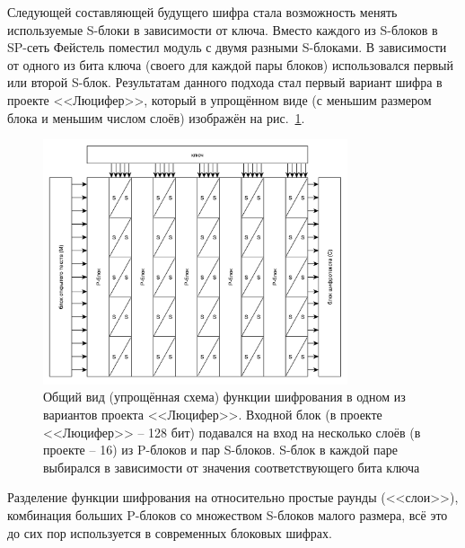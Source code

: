 Следующей составляющей будущего шифра стала возможность менять используемые S-блоки в зависимости от ключа. Вместо каждого из S-блоков в SP-сеть Фейстель поместил модуль с двумя разными S-блоками. В зависимости от одного из бита ключа (своего для каждой пары блоков) использовался первый или второй S-блок. Результатам данного подхода стал первый вариант шифра в проекте <<Люцифер>>, который в упрощённом виде (с меньшим размером блока и меньшим числом слоёв) изображён на рис.~\ref{fig:lucifer}.

\begin{figure}[htb]
	\centering
	\includegraphics[width=0.8\textwidth]{pic/lucifer}
  \caption{Общий вид (упрощённая схема) функции шифрования в одном из вариантов проекта <<Люцифер>>. Входной блок (в проекте <<Люцифер>> -- 128 бит) подавался на вход на несколько слоёв (в проекте -- 16) из P-блоков и пар S-блоков. S-блок в каждой паре выбирался в зависимости от значения соответствующего бита ключа}
  \label{fig:lucifer}
\end{figure}

Разделение функции шифрования на относительно простые раунды (<<слои>>), комбинация больших P-блоков со множеством S-блоков малого размера, всё это до сих пор используется в современных блоковых шифрах.
